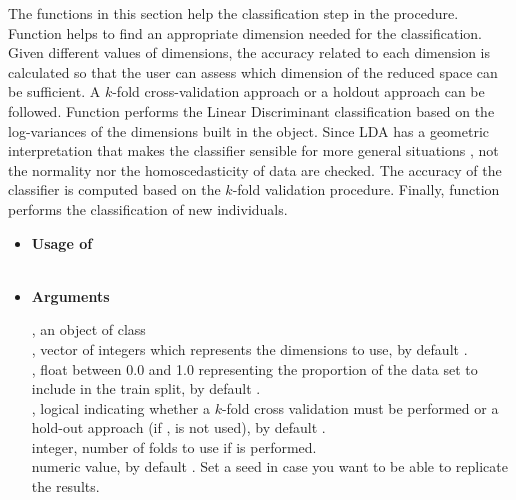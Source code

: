 The functions in this section help the classification step in the procedure. Function  helps to find an appropriate dimension needed for the classification. Given different values of dimensions, the accuracy related to each dimension is calculated so that the user can assess which dimension of the reduced space can be sufficient. A $k$-fold cross-validation approach or a holdout approach can be followed.  Function  performs the Linear Discriminant classification based on the log-variances of the dimensions built in the  object. Since LDA has a geometric interpretation that makes the classifier sensible for more general situations \cite{duda01}, not the normality nor the homoscedasticity of data are checked. The accuracy of the classifier is computed based on the $k$-fold validation procedure.   Finally,  function  performs the classification of new individuals. 

\begin{itemize}
\item{\bf Usage of } \\
 \\

\item{\bf Arguments}

, an object of class \\

, vector of integers which represents the dimensions to use, by default .\\

, float between 0.0 and 1.0 representing the proportion of the data set to include in the train split, by default .\\

, logical indicating whether a $k$-fold cross validation must be performed or a hold-out approach (if ,  is not used), by default .\\

 integer, number of folds to use if  is performed.\\

 numeric value, by default . Set a seed in case you want to be able to replicate the results.\\

\end{itemize}

